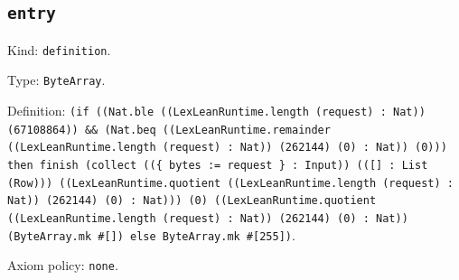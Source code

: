\documentclass[11pt]{article}
\begin{document}
\subsection*{\texttt{entry}}
\noindent Kind: \texttt{definition}.\par
\noindent Type: \texttt{ByteArray}.\par
\noindent Definition: \texttt{(if ((Nat.ble ((LexLeanRuntime.length (request) : Nat)) (67108864)) \&\& (Nat.beq ((LexLeanRuntime.remainder ((LexLeanRuntime.length (request) : Nat)) (262144) (0) : Nat)) (0))) then finish (collect ((\{ bytes := request \} : Input)) (([] : List (Row))) ((LexLeanRuntime.quotient ((LexLeanRuntime.length (request) : Nat)) (262144) (0) : Nat))) (0) ((LexLeanRuntime.quotient ((LexLeanRuntime.length (request) : Nat)) (262144) (0) : Nat)) (ByteArray.mk \#[]) else ByteArray.mk \#[255])}.\par
\noindent Axiom policy: \texttt{none}.\par
\end{document}
